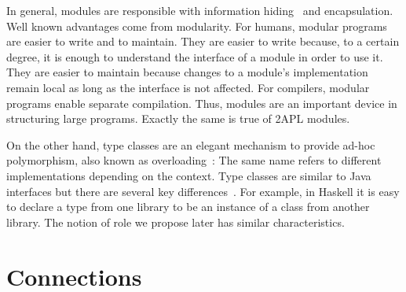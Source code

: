 \documentclass[conference,compsoc]{IEEEtran} %
\begin{document}

In general, modules are responsible with information
hiding~\cite{DBLP:journals/cacm/Parnas72a} and encapsulation. Well known
advantages come from modularity. For humans, modular programs are easier to
write and to maintain. They are easier to write because, to a certain
degree, it is enough to understand the interface of a module in order to
use it. They are easier to maintain because changes to a module's
implementation remain local as long as the interface is not affected. For
compilers, modular programs enable separate compilation. Thus, modules are
an important device in structuring large programs. Exactly the same is true
of 2APL modules.

On the other hand, type classes are an elegant mechanism to provide ad-hoc
polymorphism, also known as overloading~\cite{DBLP:conf/popl/WadlerB89}:
The same name refers to different implementations depending on the context.
Type classes are similar to Java interfaces but there are several key
differences~\cite{WEB:PJ-tc}. For example, in Haskell it is easy to declare
a type from one library to be an instance of a class from another library.
The notion of role we propose later has similar characteristics.

\section{Connections} %
\end{document}
